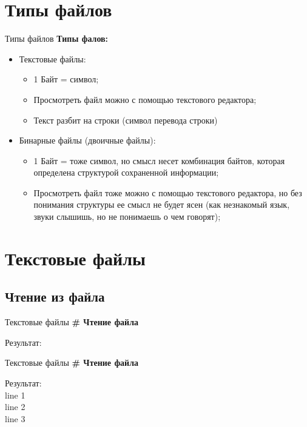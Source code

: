 \documentclass[12pt]{beamer}
\begin{document}
\section{Типы файлов}
\begin{frame}{Типы файлов}
\textbf{Типы фалов:}
\begin{itemize}
\item Текстовые файлы:
	\begin{itemize}
		\item 1 Байт = символ;
		\item Просмотреть файл можно с помощью текстового редактора;
		\item Текст разбит на строки (символ перевода строки)
	\end{itemize}
\item Бинарные файлы (двоичные файлы):
	\begin{itemize}
		\item 1 Байт = тоже символ, но смысл несет комбинация байтов, которая определена структурой сохраненной информации;
		\item Просмотреть файл тоже можно с помощью текстового редактора, но без понимания структуры ее смысл не будет ясен (как незнакомый язык, звуки слышишь, но не понимаешь о чем говорят); 
	\end{itemize}
\end{itemize}
\end{frame}


\section{Текстовые файлы}
\subsection{Чтение из файла}
\begin{frame}{Текстовые файлы}
\textbf{\# Чтение файла} \\
\vspace{0.5cm}

\vspace{0.5cm}
Результат: \\

\end{frame}


\begin{frame}{Текстовые файлы}
\textbf{\# Чтение файла} \\
\vspace{0.5cm}

\vspace{0.5cm}
Результат: \\
line 1 \\
line 2 \\
line 3 \\
\end{frame}
\end{document}
